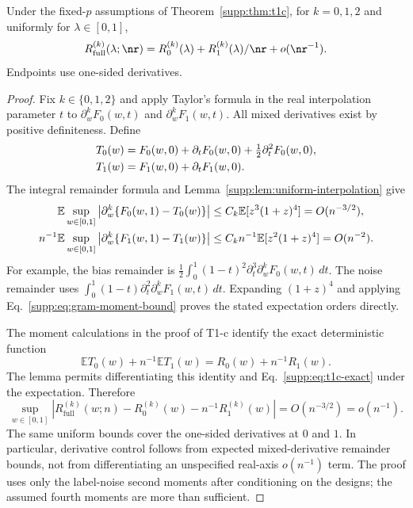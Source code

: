 \begin{theorem}\label{supp:thm:derivatives}
Under the fixed-$p$ assumptions of Theorem~\ref{supp:thm:t1c}, for $k=0,1,2$ and uniformly for $\lambda\in[0,1]$,
\begin{equation}
 R_{\mathrm{full}}^{(k)}(\lambda;\nr)
 =R_0^{(k)}(\lambda)+R_1^{(k)}(\lambda)/\nr+o(\nr^{-1}).
\end{equation}
Endpoints use one-sided derivatives.
\end{theorem}

\begin{proof}
Fix $k\in\{0,1,2\}$ and apply Taylor's formula in the real interpolation parameter $t$ to $\partial_w^kF_0(w,t)$ and $\partial_w^kF_1(w,t)$. All mixed derivatives exist by positive definiteness. Define
\begin{align}
 T_0(w)&=F_0(w,0)+\partial_tF_0(w,0)+\tfrac12\partial_t^2F_0(w,0),\notag\\
 T_1(w)&=F_1(w,0)+\partial_tF_1(w,0).
\end{align}
The integral remainder formula and Lemma~\ref{supp:lem:uniform-interpolation} give
\begin{align}
 \mathbb E\sup_{w\in[0,1]}\left|\partial_w^k\{F_0(w,1)-T_0(w)\}\right|
 &\le C_k\mathbb E[z^3(1+z)^4]=O(n^{-3/2}),\notag\\
 n^{-1}\mathbb E\sup_{w\in[0,1]}\left|\partial_w^k\{F_1(w,1)-T_1(w)\}\right|
 &\le C_kn^{-1}\mathbb E[z^2(1+z)^4]=O(n^{-2}).
 \label{supp:eq:uniform-taylor-remainders}
\end{align}
For example, the bias remainder is $\tfrac12\int_0^1(1-t)^2\partial_t^3\partial_w^kF_0(w,t)\,dt$. The noise remainder uses $\int_0^1(1-t)\partial_t^2\partial_w^kF_1(w,t)\,dt$. Expanding $(1+z)^4$ and applying Eq.~\eqref{supp:eq:gram-moment-bound} proves the stated expectation orders directly.

The moment calculations in the proof of T1-c identify the exact deterministic function
\begin{equation}
 \mathbb ET_0(w)+n^{-1}\mathbb ET_1(w)=R_0(w)+n^{-1}R_1(w).
\end{equation}
The lemma permits differentiating this identity and Eq.~\eqref{supp:eq:t1c-exact} under the expectation. Therefore
\begin{equation}
 \sup_{w\in[0,1]}\left|
 R_{\mathrm{full}}^{(k)}(w;n)-R_0^{(k)}(w)-n^{-1}R_1^{(k)}(w)
 \right|=O(n^{-3/2})=o(n^{-1}).
\end{equation}
The same uniform bounds cover the one-sided derivatives at $0$ and $1$. In particular, derivative control follows from expected mixed-derivative remainder bounds, not from differentiating an unspecified real-axis $o(n^{-1})$ term. The proof uses only the label-noise second moments after conditioning on the designs; the assumed fourth moments are more than sufficient.
\end{proof}

